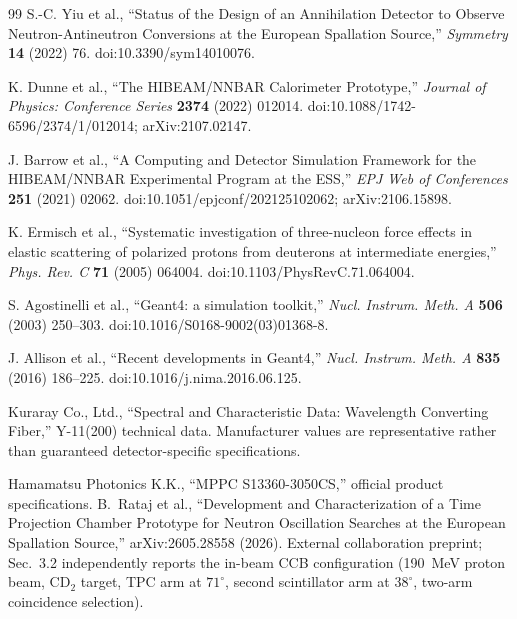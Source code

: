 \begin{thebibliography}{99}
S.-C. Yiu et al., ``Status of the Design of an Annihilation Detector to Observe Neutron-Antineutron Conversions at the European Spallation Source,'' \emph{Symmetry} \textbf{14} (2022) 76. doi:10.3390/sym14010076.

K. Dunne et al., ``The HIBEAM/NNBAR Calorimeter Prototype,'' \emph{Journal of Physics: Conference Series} \textbf{2374} (2022) 012014. doi:10.1088/1742-6596/2374/1/012014; arXiv:2107.02147.

J. Barrow et al., ``A Computing and Detector Simulation Framework for the HIBEAM/NNBAR Experimental Program at the ESS,'' \emph{EPJ Web of Conferences} \textbf{251} (2021) 02062. doi:10.1051/epjconf/202125102062; arXiv:2106.15898.

K. Ermisch et al., ``Systematic investigation of three-nucleon force effects in elastic scattering of polarized protons from deuterons at intermediate energies,'' \emph{Phys. Rev. C} \textbf{71} (2005) 064004. doi:10.1103/PhysRevC.71.064004.

S. Agostinelli et al., ``Geant4: a simulation toolkit,'' \emph{Nucl. Instrum. Meth. A} \textbf{506} (2003) 250--303. doi:10.1016/S0168-9002(03)01368-8.

J. Allison et al., ``Recent developments in Geant4,'' \emph{Nucl. Instrum. Meth. A} \textbf{835} (2016) 186--225. doi:10.1016/j.nima.2016.06.125.

Kuraray Co., Ltd., ``Spectral and Characteristic Data: Wavelength Converting Fiber,'' Y-11(200) technical data. Manufacturer values are representative rather than guaranteed detector-specific specifications.

Hamamatsu Photonics K.K., ``MPPC S13360-3050CS,'' official product specifications.
B.~Rataj et al., ``Development and Characterization of a Time Projection Chamber Prototype for Neutron Oscillation Searches at the European Spallation Source,'' arXiv:2605.28558 (2026). External collaboration preprint; Sec.~3.2 independently reports the in-beam CCB configuration (190~MeV proton beam, CD$_2$ target, TPC arm at $71^\circ$, second scintillator arm at $38^\circ$, two-arm coincidence selection).

\end{thebibliography}
